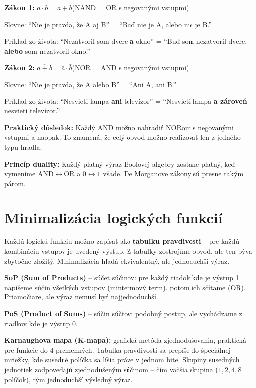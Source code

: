 \medskip
\textbf{Zákon 1:} $\overline{a \cdot b} = \bar{a} + \bar{b}$\quad (NAND = OR s negovanými vstupmi)

Slovne: ``Nie je pravda, že A aj B'' = ``Buď nie je A, alebo nie je B.''

Príklad zo života: ``Nezatvoril som dvere \textbf{a} okno'' = ``Buď som nezatvoril dvere, \textbf{alebo} som nezatvoril okno.''

\medskip
\textbf{Zákon 2:} $\overline{a + b} = \bar{a} \cdot \bar{b}$\quad (NOR = AND s negovanými vstupmi)

Slovne: ``Nie je pravda, že A alebo B'' = ``Ani A, ani B.''

Príklad zo života: ``Nesvieti lampa \textbf{ani} televízor'' = ``Nesvieti lampa \textbf{a zároveň} nesvieti televízor.''

\medskip
\textbf{Praktický dôsledok:} Každý AND možno nahradiť NORom s negovanými vstupmi a naopak. To znamená, že celý obvod možno realizovať len z jedného typu hradla.

\textbf{Princíp duality:} Každý platný výraz Boolovej algebry zostane platný, keď vymeníme AND$\leftrightarrow$OR a $0\leftrightarrow 1$ všade. De Morganove zákony sú presne takým párom.

\section{Minimalizácia logických funkcií}

Každú logickú funkciu možno zapísať ako \textbf{tabuľku pravdivosti} -- pre každú kombináciu vstupov je uvedený výstup. Z tabuľky zostrojíme obvod, ale ten býva zbytočne zložitý. Minimalizácia hľadá ekvivalentný, ale jednoduchší výraz.

\textbf{SoP (Sum of Products)} -- súčet súčinov: pre každý riadok kde je výstup 1 napíšeme súčin všetkých vstupov (mintermový term), potom ich sčítame (OR). Priamočiare, ale výraz nemusí byť najjednoduchší.

\textbf{PoS (Product of Sums)} -- súčin súčtov: podobný postup, ale vychádzame z riadkov kde je výstup 0.

\textbf{Karnaughova mapa (K-mapa):} grafická metóda zjednodušovania, praktická pre funkcie do 4 premenných. Tabuľka pravdivosti sa prepíše do špeciálnej mriežky, kde susedné políčka sa líšia práve v jednom bite. Skupiny susedných jednotiek zodpovedajú zjednodušeným súčinom -- čím väčšia skupina ($1, 2, 4, 8$ políčok), tým jednoduchší výsledný výraz.

\newpage

